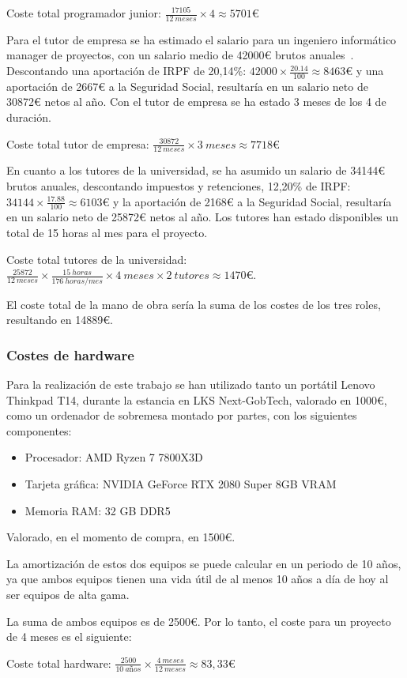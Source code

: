 \begin{center}
    Coste total programador junior: \(\frac{17105}{12~meses} \times 4 \approx 5701\)€
\end{center}

Para el tutor de empresa se ha estimado el salario para un ingeniero informático manager de proyectos, con un salario medio de 42000€ brutos anuales~\cite{glassdoor}. Descontando una aportación de IRPF de 20,14\%: \(42000 \times \frac{20.14}{100} \approx 8463\)€ y una aportación de 2667€ a la Seguridad Social, resultaría en un salario neto de 30872€ netos al año. Con el tutor de empresa se ha estado 3 meses de los 4 de duración.

\begin{center}
    Coste total tutor de empresa: \(\frac{30872}{12~meses} \times {3~meses} \approx 7718\)€
\end{center}

En cuanto a los tutores de la universidad, se ha asumido un salario de 34144€ brutos anuales, descontando impuestos y retenciones, 12,20\% de IRPF: \(34144 \times \frac{17.88}{100} \approx 6103\)€ y la aportación de 2168€ a la Seguridad Social, resultaría en un salario neto de 25872€ netos al año. Los tutores han estado disponibles un total de 15 horas al mes para el proyecto.
\begin{center}
    Coste total tutores de la universidad: \(\frac{25872}{12~meses} \times \frac{15~horas}{176~horas/mes} \times {4~meses} \times {2~tutores} \approx 1470\)€.
\end{center}

El coste total de la mano de obra sería la suma de los costes de los tres roles, resultando en 14889€.

\subsubsection{Costes de hardware}
Para la realización de este trabajo se han utilizado tanto un portátil Lenovo Thinkpad T14, durante la estancia en LKS Next-GobTech, valorado en 1000€, como un ordenador de sobremesa montado por partes, con los siguientes componentes:

\begin{itemize}
    \item Procesador: AMD Ryzen 7 7800X3D
    \item Tarjeta gráfica: NVIDIA GeForce RTX 2080 Super 8GB VRAM
    \item Memoria RAM: 32 GB DDR5
\end{itemize}

Valorado, en el momento de compra, en 1500€.

La amortización de estos dos equipos se puede calcular en un periodo de 10 años, ya que ambos equipos tienen una vida útil de al menos 10 años a día de hoy al ser equipos de alta gama.

La suma de ambos equipos es de 2500€. Por lo tanto, el coste para un proyecto de 4 meses es el siguiente:
\begin{center}
    Coste total hardware: \(\frac{2500}{10~años} \times \frac{4~meses}{12~meses} \approx 83,33\)€
\end{center}